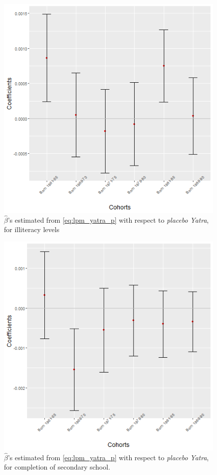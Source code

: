 \documentclass{article}
\begin{document}
\begin{figure}[H]
    \centering
    \includegraphics[scale = 0.4]{images/graph_coeff_ill_p.png}
    \caption{$\hat{\beta}$'s estimated from \eqref{eq:lpm_yatra_p} with respect to \textit{placebo Yatra}, for illiteracy levels}
    \label{fig:coeff_ill_p}
\end{figure}

\begin{figure}[H]
    \centering
    \includegraphics[scale = 0.4]{images/graph_coeff_sec_p.png}
    \caption{$\hat{\beta}$'s estimated from \eqref{eq:lpm_yatra_p} with respect to \textit{placebo Yatra}, for completion of secondary school.}
    \label{fig:coeff_sec_p}
\end{figure}
\end{document}
